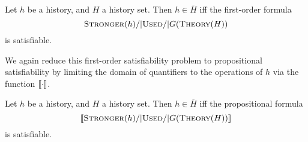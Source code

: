 \begin{theorem}
  \label{th:satisfiability_complete}

  Let $h$ be a history, and $H$ a history set. Then $h \in \overline{H}$ if{f}
  the first-order formula
  $$\textsc{Stronger}(h) /| \textsc{Used} /| G(\textsc{Theory}(H))$$
  is satisfiable.

\end{theorem}

We again reduce this first-order satisfiability problem to propositional
satisfiability by limiting the domain of quantifiers to the operations of $h$
via the function $[\![{\cdot}]\!]$.

\begin{corollary}
  \label{cor:satisfiability_pending}

  Let $h$ be a history, and $H$ a history set. Then $h \in \overline{H}$ if{f}
  the propositional formula
  $$[\![{\textsc{Stronger}(h) /| \textsc{Used} /| G(\textsc{Theory}(H))}]\!]$$
  is satisfiable.

\end{corollary}
